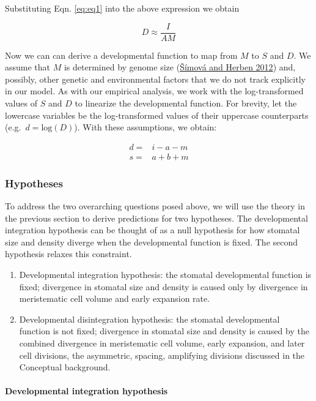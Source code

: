 \documentclass[
  12pt,
]{article}
\begin{document}
Substituting Eqn. \ref{eq:eq1} into the above expression we obtain

\[D \approx \frac{I}{A M}\]

Now we can can derive a developmental function to map from \(M\) to \(S\) and \(D\). We assume that \(M\) is determined by genome size (\protect\hyperlink{ref-simova_geometrical_2012}{Šímová and Herben 2012}) and, possibly, other genetic and environmental factors that we do not track explicitly in our model. As with our empirical analysis, we work with the log-transformed values of \(S\) and \(D\) to linearize the developmental function. For brevity, let the lowercase variables be the log-transformed values of their uppercase counterparts (e.g.~\(d = \textrm{log}(D)\)). With these assumptions, we obtain:

\begin{align}
  d = & i - a - m \\
  s = & a + b + m 
  \label{eq:dev-fun}
\end{align}

\hypertarget{hypotheses}{%
\subsubsection{Hypotheses}\label{hypotheses}}

To address the two overarching questions posed above, we will use the theory in the previous section to derive predictions for two hypotheses. The developmental integration hypothesis can be thought of as a null hypothesis for how stomatal size and density diverge when the developmental function is fixed. The second hypothesis relaxes this constraint.

\begin{enumerate}
\def\labelenumi{\arabic{enumi}.}
\item
  Developmental integration hypothesis: the stomatal developmental function is fixed; divergence in stomatal size and density is caused only by divergence in meristematic cell volume and early expansion rate.
\item
  Developmental disintegration hypothesis: the stomatal developmental function is not fixed; divergence in stomatal size and density is caused by the combined divergence in meristematic cell volume, early expansion, and later cell divisions, the asymmetric, spacing, amplifying divisions discussed in the Conceptual background.
\end{enumerate}

\hypertarget{developmental-integration-hypothesis}{%
\paragraph{Developmental integration hypothesis}\label{developmental-integration-hypothesis}}
\end{document}
